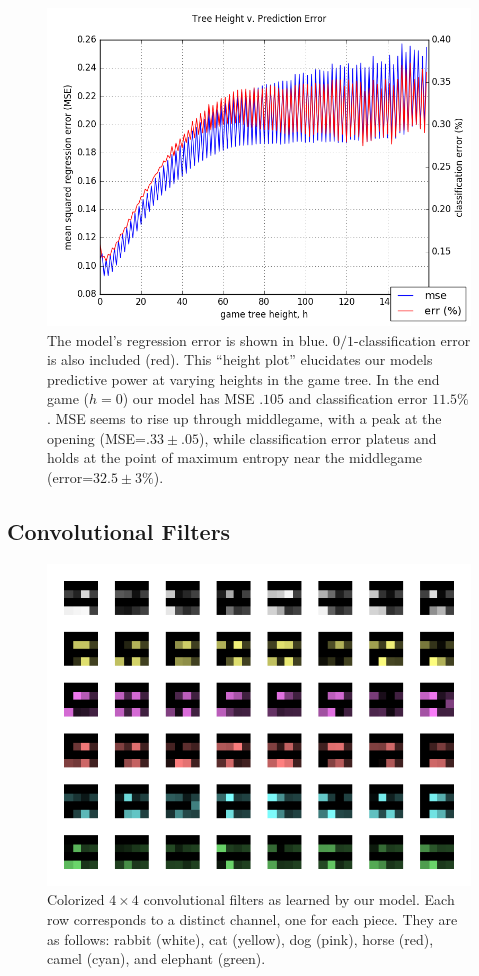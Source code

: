 \documentclass{article}
\begin{document}
\begin{figure}[ht]
\centering
\includegraphics[scale=.5]{assets/figure-hplot.png}
\caption{The model's regression error is shown in blue.  $0/1$-classification error is also included (red).  This ``height plot'' elucidates our models predictive power at varying heights in the game tree.  In the end game ($h=0$) our model has MSE $.105$ and classification error $11.5\%$.  MSE seems to rise up through middlegame, with a peak at the opening (MSE=$.33\pm .05$), while classification error plateus and holds at the point of maximum entropy near the middlegame (error=$32.5\pm 3 \%$). \label{fig:hplot}}
\end{figure}

\subsection{Convolutional Filters}

\begin{figure}[h]
\centering
\includegraphics[scale=.6]{assets/figure-filters.png}
\caption{Colorized $4\times 4$ convolutional filters as learned by our model.  Each row corresponds to a distinct channel, one for each piece.  They are as follows: rabbit (white), cat (yellow), dog (pink), horse (red), camel (cyan), and elephant (green). }
\end{figure}
\end{document}
